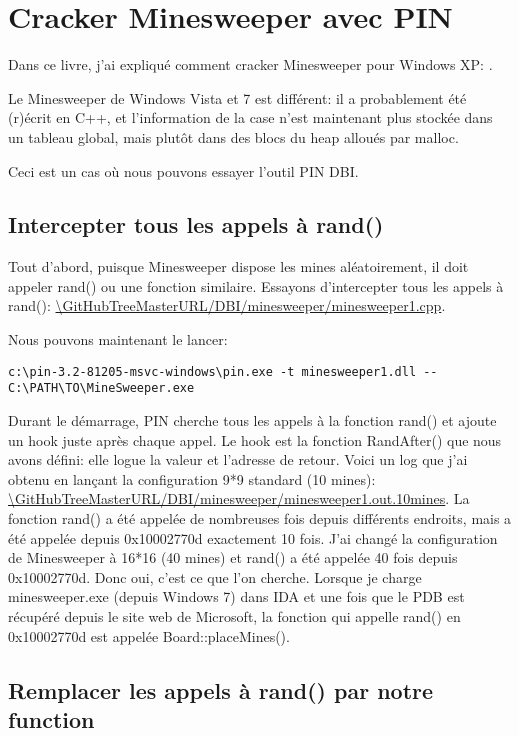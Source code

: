 \section{Cracker Minesweeper avec PIN}

\newcommand{\GitHubMinesweeperURL}{\GitHubTreeMasterURL/DBI/minesweeper}

Dans ce livre, j'ai expliqué comment cracker Minesweeper pour Windows XP: .

Le Minesweeper de Windows Vista et 7 est différent: il a probablement été (r)écrit
en C++, et l'information de la case n'est maintenant plus stockée dans un tableau
global, mais plutôt dans des blocs du heap alloués par malloc.

Ceci est un cas où nous pouvons essayer l'outil PIN DBI.

\subsection{Intercepter tous les appels à rand()}

Tout d'abord, puisque Minesweeper dispose les mines aléatoirement, il doit appeler
rand() ou une fonction similaire.
Essayons d'intercepter tous les appels à rand(): \url{\GitHubMinesweeperURL/minesweeper1.cpp}.

Nous pouvons maintenant le lancer:

\begin{lstlisting}
c:\pin-3.2-81205-msvc-windows\pin.exe -t minesweeper1.dll -- C:\PATH\TO\MineSweeper.exe
\end{lstlisting}

Durant le démarrage, PIN cherche tous les appels à la fonction rand() et ajoute un
hook juste après chaque appel.
Le hook est la fonction RandAfter() que nous avons défini: elle logue la valeur et l'adresse
de retour.
Voici un log que j'ai obtenu en lançant la configuration 9*9 standard (10 mines):
 \url{\GitHubMinesweeperURL/minesweeper1.out.10mines}.
La fonction rand() a été appelée de nombreuses fois depuis différents endroits, mais
a été appelée depuis 0x10002770d exactement 10 fois.
J'ai changé la configuration de Minesweeper à 16*16 (40 mines) et rand() a été appelée
40 fois depuis 0x10002770d.
Donc oui, c'est ce que l'on cherche.
Lorsque je charge minesweeper.exe (depuis Windows 7) dans IDA et une fois que le
PDB est récupéré depuis le site web de Microsoft, la fonction qui appelle rand()
en 0x10002770d est appelée Board::placeMines().

\subsection{Remplacer les appels à rand() par notre function}

